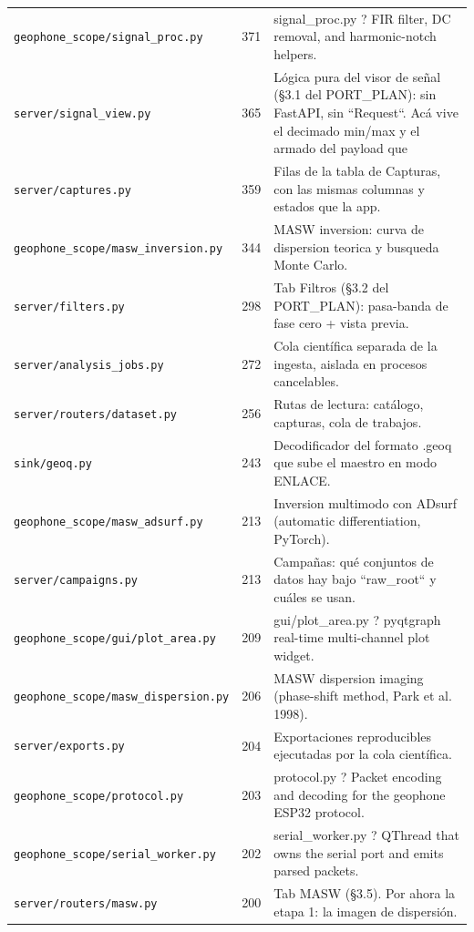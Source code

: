 \begin{longtable}{@{}p{5.4cm} r p{8.6cm}@{}}
\texttt{\scriptsize geophone\_scope/signal\_proc.py} & 371 & signal\_proc.py ? FIR filter, DC removal, and harmonic-notch helpers. \\
\texttt{\scriptsize server/signal\_view.py} & 365 & Lógica pura del visor de señal (§3.1 del PORT\_PLAN): sin FastAPI, sin ``Request``. Acá vive el decimado min/max y el armado del payload que \\
\texttt{\scriptsize server/captures.py} & 359 & Filas de la tabla de Capturas, con las mismas columnas y estados que la app. \\
\texttt{\scriptsize geophone\_scope/masw\_inversion.py} & 344 & MASW inversion: curva de dispersion teorica y busqueda Monte Carlo. \\
\texttt{\scriptsize server/filters.py} & 298 & Tab Filtros (§3.2 del PORT\_PLAN): pasa-banda de fase cero + vista previa. \\
\texttt{\scriptsize server/analysis\_jobs.py} & 272 & Cola científica separada de la ingesta, aislada en procesos cancelables. \\
\texttt{\scriptsize server/routers/dataset.py} & 256 & Rutas de lectura: catálogo, capturas, cola de trabajos. \\
\texttt{\scriptsize sink/geoq.py} & 243 & Decodificador del formato .geoq que sube el maestro en modo ENLACE. \\
\texttt{\scriptsize geophone\_scope/masw\_adsurf.py} & 213 & Inversion multimodo con ADsurf (automatic differentiation, PyTorch). \\
\texttt{\scriptsize server/campaigns.py} & 213 & Campañas: qué conjuntos de datos hay bajo ``raw\_root`` y cuáles se usan. \\
\texttt{\scriptsize geophone\_scope/gui/plot\_area.py} & 209 & gui/plot\_area.py ? pyqtgraph real-time multi-channel plot widget. \\
\texttt{\scriptsize geophone\_scope/masw\_dispersion.py} & 206 & MASW dispersion imaging (phase-shift method, Park et al. 1998). \\
\texttt{\scriptsize server/exports.py} & 204 & Exportaciones reproducibles ejecutadas por la cola científica. \\
\texttt{\scriptsize geophone\_scope/protocol.py} & 203 & protocol.py ? Packet encoding and decoding for the geophone ESP32 protocol. \\
\texttt{\scriptsize geophone\_scope/serial\_worker.py} & 202 & serial\_worker.py ? QThread that owns the serial port and emits parsed packets. \\
\texttt{\scriptsize server/routers/masw.py} & 200 & Tab MASW (§3.5). Por ahora la etapa 1: la imagen de dispersión. \\

\end{longtable}
